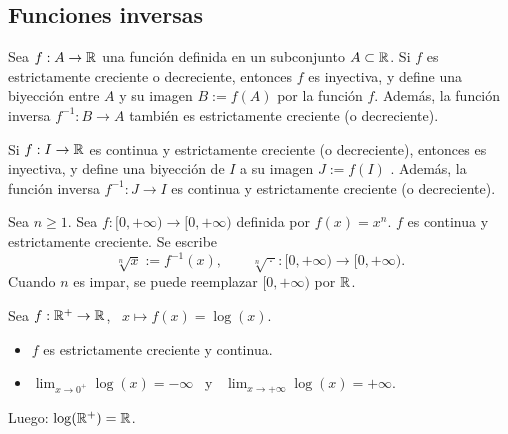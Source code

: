 \documentclass[11pt,a4paper]{article}
\begin{document}
\subsection{Funciones inversas}

\begin{proposicion}
Sea $f:A\to\mathbb{R}$ una función definida en un subconjunto $A\subset\mathbb{R}$. Si $f$ es estrictamente creciente o decreciente, entonces $f$ es inyectiva, y define una biyección entre $A$ y su imagen $B:=f(A)$ por la función $f$. Además, la función inversa $f^{-1}:B\to A$ también es estrictamente creciente (o decreciente).
\end{proposicion}

\begin{teorema}
Si $f:I\to\mathbb{R}$ es continua y estrictamente creciente (o decreciente), entonces es inyectiva, y define una biyección de $I$ a su imagen $J:=f(I)$ . Además, la función inversa $f^{-1}:J\to I$ es continua y estrictamente creciente (o decreciente).
\end{teorema}

\begin{center}
\end{center}

\begin{ejemplo}
Sea $n\geq1$. Sea $f:[0,+\infty)\to[0,+\infty)$ definida por $f(x)=x^n$. $f$ es continua y estrictamente creciente. Se escribe
\[
  \sqrt[n]{x}:=f^{-1}(x),\qquad \sqrt[n]{\,\cdot\,}:[0,+\infty)\to[0,+\infty).
\]
Cuando $n$ es impar, se puede reemplazar $[0,+\infty)$ por $\mathbb{R}$.
\end{ejemplo}

\begin{ejemplo}
Sea $f:\mathbb{R}^+\to\mathbb{R}$, \ $x\mapsto f(x)=\log(x)$.
\begin{itemize}
  \item $f$ es estrictamente creciente y continua.
  \item $\displaystyle\lim_{x\to0^+}\log(x)=-\infty$ \ y \ $\displaystyle\lim_{x\to+\infty}\log(x)=+\infty$.
\end{itemize}
Luego: $\log(\mathbb{R}^+)=\mathbb{R}$.
\end{ejemplo}
\end{document}

